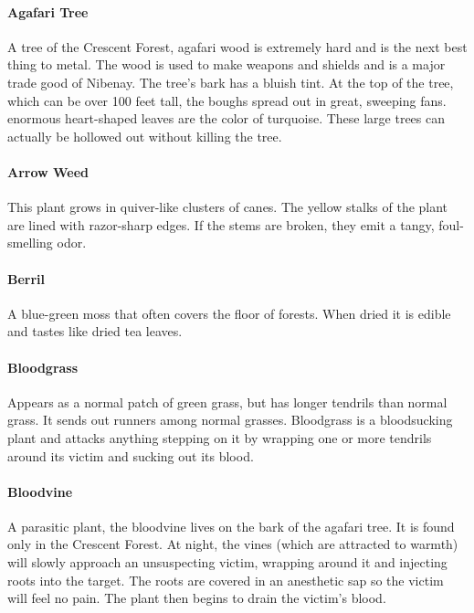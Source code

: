 \begin{multicols}{2}

\paragraph{Agafari Tree}
A tree of the Crescent Forest, agafari wood is extremely hard and is the next
best thing to metal. The wood is used to make weapons and shields and is a major
trade good of Nibenay. The tree's bark has a bluish tint. At the top of the tree,
which can be over 100 feet tall, the boughs spread out in great, sweeping fans.
enormous heart-shaped leaves are the color of turquoise. These large trees can
actually be hollowed out without killing the tree.

\paragraph{Arrow Weed}
This plant grows in quiver-like clusters of canes. The yellow stalks of the plant
are lined with razor-sharp edges. If the stems are broken, they emit a tangy,
foul-smelling odor.

\paragraph{Berril}
A blue-green moss that often covers the floor of forests. When dried it is
edible and tastes like dried tea leaves.

\paragraph{Bloodgrass}
Appears as a normal patch of green grass, but has longer tendrils than normal
grass. It sends out runners among normal grasses. Bloodgrass is a bloodsucking
plant and attacks anything stepping on it by wrapping one or more tendrils
around its victim and sucking out its blood.

\paragraph{Bloodvine}
A parasitic plant, the bloodvine lives on the bark of the agafari tree. It
is found only in the Crescent Forest. At night, the vines (which are attracted
to warmth) will slowly approach an unsuspecting victim, wrapping around it and
injecting roots into the target. The roots are covered in an anesthetic sap so
the victim will feel no pain. The plant then begins to drain the victim's blood.


\end{multicols}
